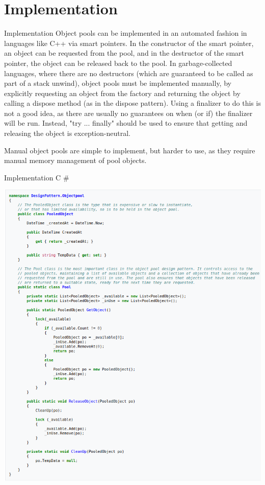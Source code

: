 \documentclass{beamer}
\begin{document}
\section{Implementation}
\begin{frame}{Implementation}
Object pools can be implemented in an automated fashion in languages like C++ via smart pointers. In the constructor of the smart pointer, an object can be requested from the pool, and in the destructor of the smart pointer, the object can be released back to the pool. In garbage-collected languages, where there are no destructors (which are guaranteed to be called as part of a stack unwind), object pools must be implemented manually, by explicitly requesting an object from the factory and returning the object by calling a dispose method (as in the dispose pattern). Using a finalizer to do this is not a good idea, as there are usually no guarantees on when (or if) the finalizer will be run. Instead, "try ... finally" should be used to ensure that getting and releasing the object is exception-neutral.

Manual object pools are simple to implement, but harder to use, as they require manual memory management of pool objects.
\end{frame}

\begin{frame}{Implementation C \#}

\includegraphics[scale=0.25]{c.png}
\centering
\end{frame}
\end{document}
